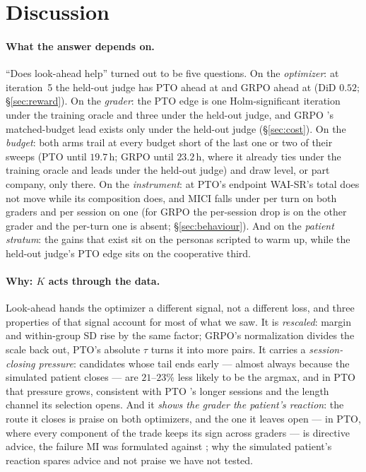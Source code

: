 \section{Discussion}
\label{sec:discussion}

\paragraph{What the answer depends on.} ``Does look-ahead help'' turned out to be five
questions. On the \emph{optimizer}: at iteration~5 the held-out judge has PTO ahead at \Kz{}
and GRPO ahead at \Kf{} (DiD \dz{} $0.52$; \S\ref{sec:reward}). On the \emph{grader}: the PTO
\Kz{} edge is one Holm-significant iteration under the training oracle and three under the
held-out judge, and GRPO \Kf{}'s matched-budget lead exists only under the held-out judge
(\S\ref{sec:cost}). On the \emph{budget}: both \Kf{} arms trail at every budget short of the last
one or two of their sweeps (PTO \Kf{} until $19.7$\,h; GRPO \Kf{} until $23.2$\,h, where it
already ties under the training oracle and leads under the held-out judge) and draw level, or
part company, only there. On the \emph{instrument}: at PTO's endpoint WAI-SR's total does not
move while its composition does, and MICI falls under \Kf{} per turn on both graders and per
session on one (for GRPO the per-session drop is on the other grader and the per-turn one is
absent; \S\ref{sec:behaviour}). And on the \emph{patient stratum}: the \Kf{} gains that exist
sit on the personas scripted to warm up, while the held-out judge's \Kz{} PTO edge sits on the
cooperative third.

\paragraph{Why: $K$ acts through the data.} Look-ahead hands the optimizer a different signal,
not a different loss, and three properties of that signal account for most of what we saw. It
is \emph{rescaled}: margin and within-group SD rise by the same factor; GRPO's normalization
divides the scale back out, PTO's absolute $\tau$ turns it into more pairs. It carries a
\emph{session-closing pressure}: candidates whose tail ends early --- almost always because the
simulated patient closes --- are $21$--$23\%$ less likely to be the argmax, and in PTO that
pressure grows, consistent with PTO \Kf{}'s longer sessions and the length channel its selection
opens. And it \emph{shows the grader the patient's reaction}: the route it closes is praise on
both optimizers, and the one it leaves open --- in PTO, where every component of the trade keeps
its sign across graders --- is directive advice, the failure MI was formulated against
\citep{miller1991mi}; why the simulated patient's reaction spares advice and not praise we have
not tested.

